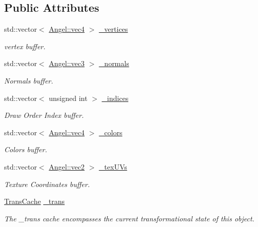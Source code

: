 \subsection*{Public Attributes}
\begin{DoxyCompactItemize}
\item 
std\-::vector$<$ \hyperlink{struct_angel_1_1vec4}{Angel\-::vec4} $>$ \hyperlink{class_object_a4ac354b3ec284f27358b1d4b8d95b9a9}{\-\_\-vertices}
\begin{DoxyCompactList}\small\item\em vertex buffer. \end{DoxyCompactList}\item 
std\-::vector$<$ \hyperlink{struct_angel_1_1vec3}{Angel\-::vec3} $>$ \hyperlink{class_object_a20bb786cb5915934853855aab9d1a1b3}{\-\_\-normals}
\begin{DoxyCompactList}\small\item\em Normals buffer. \end{DoxyCompactList}\item 
std\-::vector$<$ unsigned int $>$ \hyperlink{class_object_ab85adc7a2d3b891051c096593982653d}{\-\_\-indices}
\begin{DoxyCompactList}\small\item\em Draw Order Index buffer. \end{DoxyCompactList}\item 
std\-::vector$<$ \hyperlink{struct_angel_1_1vec4}{Angel\-::vec4} $>$ \hyperlink{class_object_a29a0e9959c490067db69378bf57a17ba}{\-\_\-colors}
\begin{DoxyCompactList}\small\item\em Colors buffer. \end{DoxyCompactList}\item 
std\-::vector$<$ \hyperlink{struct_angel_1_1vec2}{Angel\-::vec2} $>$ \hyperlink{class_object_aa9ddc3b95d74b76ab8a251fb376dfafb}{\-\_\-tex\-U\-Vs}
\begin{DoxyCompactList}\small\item\em Texture Coordinates buffer. \end{DoxyCompactList}\item 
\hypertarget{class_object_af17d57ea2dab64e21112e8949d50d85f}{\hyperlink{class_trans_cache}{Trans\-Cache} \hyperlink{class_object_af17d57ea2dab64e21112e8949d50d85f}{\-\_\-trans}}\label{class_object_af17d57ea2dab64e21112e8949d50d85f}

\begin{DoxyCompactList}\small\item\em The \-\_\-trans cache encompasses the current transformational state of this object. \end{DoxyCompactList}\end{DoxyCompactItemize}
